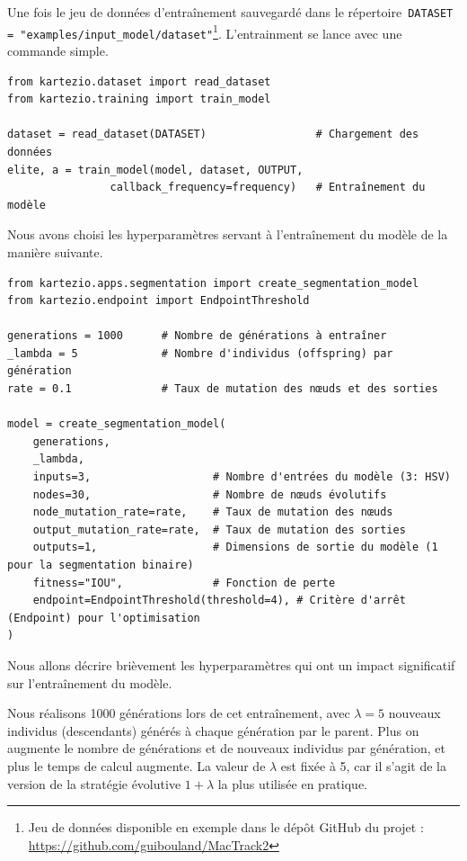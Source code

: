 \documentclass[a4paper,12pt]{report}
\begin{document}

Une fois le jeu de données d'entraînement sauvegardé dans le répertoire~\texttt{DATASET = "examples/input_model/dataset"}\footnote{Jeu de données disponible en exemple dans le dépôt GitHub du projet : \url{https://github.com/guibouland/MacTrack2}}. L'entrainment se lance avec une commande simple.

\begin{verbatim}
from kartezio.dataset import read_dataset
from kartezio.training import train_model

dataset = read_dataset(DATASET)                 # Chargement des données     
elite, a = train_model(model, dataset, OUTPUT, 
                callback_frequency=frequency)   # Entraînement du modèle
\end{verbatim}

Nous avons choisi les hyperparamètres servant à l'entraînement du modèle de la manière suivante.

\begin{verbatim}
from kartezio.apps.segmentation import create_segmentation_model
from kartezio.endpoint import EndpointThreshold

generations = 1000      # Nombre de générations à entraîner
_lambda = 5             # Nombre d'individus (offspring) par génération
rate = 0.1              # Taux de mutation des nœuds et des sorties

model = create_segmentation_model(
    generations,
    _lambda,
    inputs=3,                   # Nombre d'entrées du modèle (3: HSV)
    nodes=30,                   # Nombre de nœuds évolutifs
    node_mutation_rate=rate,    # Taux de mutation des nœuds
    output_mutation_rate=rate,  # Taux de mutation des sorties
    outputs=1,                  # Dimensions de sortie du modèle (1 pour la segmentation binaire)
    fitness="IOU",              # Fonction de perte
    endpoint=EndpointThreshold(threshold=4), # Critère d'arrêt (Endpoint) pour l'optimisation
)
\end{verbatim}

Nous allons décrire brièvement les hyperparamètres qui ont un impact significatif sur l'entraînement du modèle.

Nous réalisons 1000 générations lors de cet entraînement, avec $\lambda=5$ nouveaux individus (descendants) générés à chaque génération par le parent. Plus on augmente le nombre de générations et de nouveaux individus par génération, et plus le temps de calcul augmente. La valeur de $\lambda$ est fixée à 5, car il s'agit de la version de la stratégie évolutive $1+\lambda$ la plus utilisée en pratique.
\end{document}
